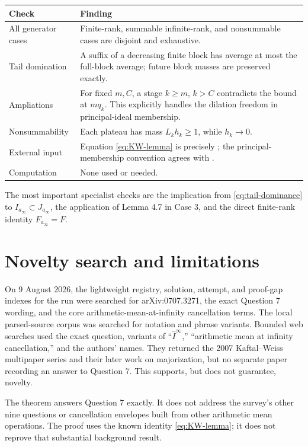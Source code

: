 \documentclass[11pt]{article}
\newcommand{\ainf}{a_\infty}
\newcommand{\F}{F}
\begin{document}
\begin{center}
\begin{tabular}{p{}p{}}
\toprule
Check & Finding\\
\midrule
All generator cases & Finite-rank, summable infinite-rank, and nonsummable
cases are disjoint and exhaustive.\\
Tail domination & A suffix of a decreasing finite block has average at most
the full-block average; future block masses are preserved exactly.\\
Ampliations & For fixed $m,C$, a stage $k\ge m$, $k>C$ contradicts the bound
at $mq_k$.  This explicitly handles the dilation freedom in principal-ideal
membership.\\
Nonsummability & Each plateau has mass $L_kh_k\ge1$, while $h_k\to0$.\\
External input & Equation \eqref{eq:KW-lemma} is precisely
\cite[Lemma~4.7]{KWtraces}; the principal-membership convention agrees with
\cite[\S2.1]{KWsurvey}.\\
Computation & None used or needed.\\
\bottomrule
\end{tabular}
\end{center}

The most important specialist checks are the implication from
\eqref{eq:tail-dominance} to $I_{\ainf}\subset J_{\ainf}$, the application of
Lemma 4.7 in Case 3, and the direct finite-rank identity
$\F_{\ainf}=\F$.

\section{Novelty search and limitations}

On 9 August 2026, the lightweight registry, solution, attempt, and proof-gap
indexes for the run were searched for arXiv:0707.3271, the exact Question 7
wording, and the core arithmetic-mean-at-infinity cancellation terms.  The
local parsed-source corpus was searched for notation and phrase variants.
Bounded web searches used the exact question, variants of
``$\widehat I^{\infty}$,'' ``arithmetic mean at infinity cancellation,'' and
the authors' names.  They returned the 2007 Kaftal--Weiss multipaper series
and their later work on majorization, but no separate paper recording an
answer to Question 7.  This supports, but does not guarantee, novelty.

The theorem answers Question 7 exactly.  It does not address the survey's
other nine questions or cancellation envelopes built from other arithmetic
mean operations.  The proof uses the known identity \eqref{eq:KW-lemma}; it
does not reprove that substantial background result.
\end{document}
